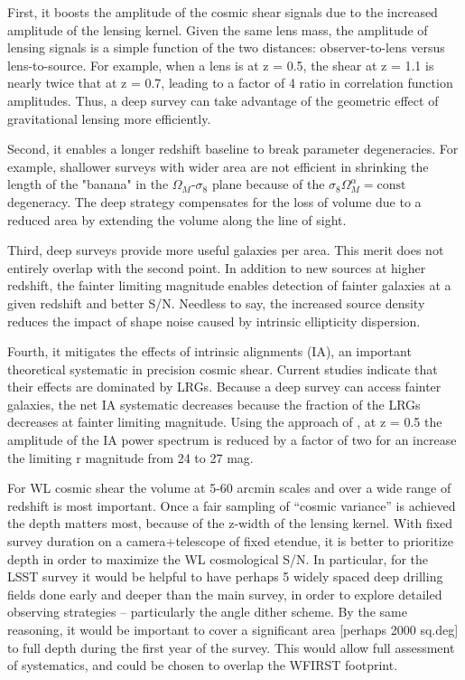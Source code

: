 First, it boosts the amplitude of the cosmic shear signals due to the increased
amplitude of the lensing kernel.  Given the same lens mass, the amplitude of
lensing signals is a simple function of the two distances: observer-to-lens
versus lens-to-source. For example, when a lens is at z = 0.5, the shear at z =
1.1 is nearly twice that at z = 0.7, leading to a factor of 4 ratio in
correlation function amplitudes.  Thus, a deep survey can take advantage of the
geometric effect of gravitational lensing more efficiently.

Second, it enables a longer redshift baseline to break parameter degeneracies.
For example, shallower surveys with wider area are not efficient in shrinking
the length of the "banana" in the $\Omega_M$-$\sigma_8$ plane because of the
$\sigma_8 \Omega_M^\alpha = \mathrm{const}$ degeneracy.  The deep strategy
compensates for the loss of volume due to a reduced area by extending the volume
along the line of sight.

Third, deep surveys provide more useful galaxies per area.  This merit does not
entirely overlap with the second point.  In addition to new sources at higher
redshift, the fainter limiting magnitude enables detection of fainter galaxies
at a given redshift and better S/N.  Needless to say, the increased source
density reduces the impact of shape noise caused by intrinsic ellipticity
dispersion.

Fourth, it mitigates the effects of intrinsic alignments (IA), an important
theoretical systematic in precision cosmic shear.  Current studies
\citep{Heymans2013} indicate that their effects are dominated by LRGs.  Because
a deep survey can access fainter galaxies, the net IA systematic decreases
because the fraction of the LRGs decreases at fainter limiting magnitude. Using
the approach of \citet{Joachimi2011},  at z = 0.5 the amplitude of the IA power
spectrum is reduced by a factor of two for an increase the limiting r magnitude
from 24 to 27 mag.

For WL cosmic shear the volume at 5-60 arcmin scales and over a wide range of
redshift is most important. Once a fair sampling of “cosmic variance” is
achieved the depth matters most, because of the z-width of the lensing kernel.
With fixed survey duration on a camera+telescope of fixed etendue, it is better
to prioritize depth in order to maximize the WL cosmological S/N.  In
particular, for the LSST survey it would be helpful to have perhaps 5 widely
spaced deep drilling fields done early and deeper than the main survey, in order
to explore detailed observing strategies -- particularly the angle dither
scheme.  By the same reasoning, it would be important to cover a significant
area [perhaps 2000 sq.deg] to full depth during the first year of the survey.
This would allow full assessment of systematics, and could be chosen to overlap
the WFIRST footprint.


